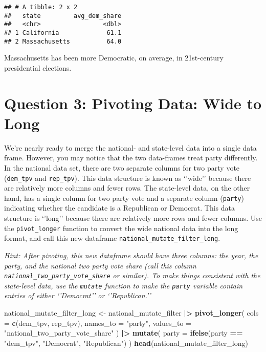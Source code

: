 \documentclass[
]{article}
\newenvironment{Shaded}{\begin{snugshade}}{\end{snugshade}}
\newcommand{\AttributeTok}[1]{\textcolor[rgb]{0.13,0.29,0.53}{#1}}
\newcommand{\FunctionTok}[1]{\textcolor[rgb]{0.13,0.29,0.53}{\textbf{#1}}}
\newcommand{\NormalTok}[1]{#1}
\newcommand{\OtherTok}[1]{\textcolor[rgb]{0.56,0.35,0.01}{#1}}
\newcommand{\SpecialCharTok}[1]{\textcolor[rgb]{0.81,0.36,0.00}{\textbf{#1}}}
\newcommand{\StringTok}[1]{\textcolor[rgb]{0.31,0.60,0.02}{#1}}
\begin{document}
\begin{verbatim}
## # A tibble: 2 x 2
##   state         avg_dem_share
##   <chr>                 <dbl>
## 1 California             61.1
## 2 Massachusetts          64.0
\end{verbatim}

Massachusetts has been more Democratic, on average, in 21st-century
presidential elections.

\section{Question 3: Pivoting Data: Wide to
Long}\label{question-3-pivoting-data-wide-to-long}

We're nearly ready to merge the national- and state-level data into a
single data frame. However, you may notice that the two data-frames
treat party differently. In the national data set, there are two
separate columns for two party vote (\texttt{dem\_tpv} and
\texttt{rep\_tpv}). This data structure is known as `'wide'' because
there are relatively more columns and fewer rows. The state-level data,
on the other hand, has a single column for two party vote and a separate
column (\texttt{party}) indicating whether the candidate is a Republican
or Democrat. This data structure is `'long'' because there are
relatively more rows and fewer columns. Use the \texttt{pivot\_longer}
function to convert the wide national data into the long format, and
call this new dataframe \texttt{national\_mutate\_filter\_long}.

\emph{Hint: After pivoting, this new dataframe should have three
columns: the year, the party, and the national two party vote share
(call this column \texttt{national\_two\_party\_vote\_share} or
similar). To make things consistent with the state-level data, use the
\texttt{mutate} function to make the \texttt{party} variable contain
entries of either `'Democrat'' or `'Republican.''}

\begin{Shaded}
\begin{Highlighting}[]
\NormalTok{national\_mutate\_filter\_long }\OtherTok{\textless{}{-}}\NormalTok{ national\_mutate\_filter }\SpecialCharTok{|\textgreater{}}
  \FunctionTok{pivot\_longer}\NormalTok{(}
    \AttributeTok{cols =} \FunctionTok{c}\NormalTok{(dem\_tpv, rep\_tpv),}
    \AttributeTok{names\_to =} \StringTok{"party"}\NormalTok{,}
    \AttributeTok{values\_to =} \StringTok{"national\_two\_party\_vote\_share"}
\NormalTok{  ) }\SpecialCharTok{|\textgreater{}}
  \FunctionTok{mutate}\NormalTok{(}
    \AttributeTok{party =} \FunctionTok{ifelse}\NormalTok{(party }\SpecialCharTok{==} \StringTok{"dem\_tpv"}\NormalTok{, }\StringTok{"Democrat"}\NormalTok{, }\StringTok{"Republican"}\NormalTok{)}
\NormalTok{  )}
\FunctionTok{head}\NormalTok{(national\_mutate\_filter\_long)}
\end{Highlighting}
\end{Shaded}
\end{document}
